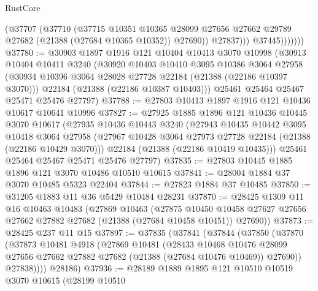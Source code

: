 \begin{lexlean}{RustCore}
\begin{coremodule}
                      (@37707
                        (@37710
                          (@37715
                            @10351
                            @10365
                            @28099
                            @27656
                            @27662
                            @29789
                            @27682
                            (@21388 (@27684 @10365 @10352))
                            @27690))
                        @27837)))
                  @37445)))))))
@37780 := @30903
    @1897
    @1916
    @121
    @10404
    @10413
    @3070
    @10998
    (@30913
      @10404
      @10411
      @3240
      (@30920
        @10403
        @10410
        @3095
        @10386
        @3064
        @27958
        (@30934 @10396 @3064 @28028 @27728 @22184 (@21388 (@22186 @10397 @3070)))
        @22184
        (@21388 (@22186 @10387 @10403)))
      @25461
      @25464
      @25467
      @25471
      @25476
      @27797)
@37788 := @27803 @10413 @1897 @1916 @121 @10436 @10617 @10641 @10996
@37827 := @27925
    @1885
    @1896
    @121
    @10436
    @10445
    @3070
    @10617
    (@27935
      @10436
      @10443
      @3240
      (@27943
        @10435
        @10442
        @3095
        @10418
        @3064
        @27958
        (@27967 @10428 @3064 @27973 @27728 @22184 (@21388 (@22186 @10429 @3070)))
        @22184
        (@21388 (@22186 @10419 @10435)))
      @25461
      @25464
      @25467
      @25471
      @25476
      @27797)
@37835 := @27803 @10445 @1885 @1896 @121 @3070 @10486 @10510 @10615
@37841 := @28004 @1884 @37 @3070 @10485 @5323 @22404
@37844 := @27823 @1884 @37 @10485
@37850 := @31205 @1883 @11 @36 @5429 @10484 @28231
@37870 := @28425
    @1309
    @11
    @16
    @10463
    @10483
    (@27869
      @10463
      (@27875
        @10450
        @10458
        @27627
        @27656
        @27662
        @27882
        @27682
        (@21388 (@27684 @10458 @10451))
        @27690))
@37873 := @28425 @237 @11 @15
@37897 := @37835
    (@37841
      (@37844
        (@37850
          (@37870
            (@37873
              @10481
              @4918
              (@27869
                @10481
                (@28433
                  @10468
                  @10476
                  @28099
                  @27656
                  @27662
                  @27882
                  @27682
                  (@21388 (@27684 @10476 @10469))
                  @27690))
              @27838))))
      @28186)
@37936 := @28189
    @1889
    @1895
    @121
    @10510
    @10519
    @3070
    @10615
    (@28199
      @10510

\end{coremodule}
\end{lexlean}

